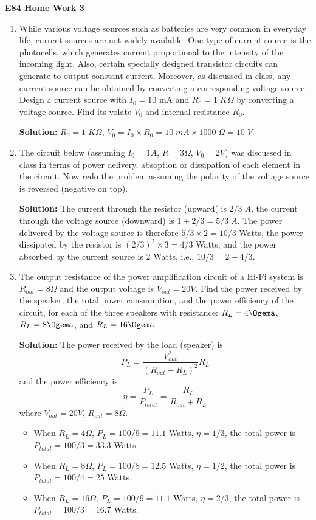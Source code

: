 \usepackage{html}

\begin{center}
{\Large \bf E84 Home Work 3}
\end{center}
\begin{enumerate}

\item While various voltage sources such as batteries are very common 
in everyday life, current sources are not widely available. One type of
current source is the photocells, which generates current proportional 
to the intensity of the incoming light. Also, certain specially designed
transistor circuits can generate to output constant current. Moreover, 
as discussed in class, any current source can be obtained by converting
a corresponding voltage source. Design a current source with $I_0=10$ mA 
and $R_0=1\;K\Omega$ by converting a voltage source. Find its volate $V_0$
and internal resistance $R_0$. 

{\bf Solution:} $R_0=1\;K\Omega$, $V_0=I_0\times R_0=10\;mA \times 1000\;
\Omega=10\;V$.

\item The circuit below (assuming $I_0=1A$, $R=3\Omega$, $V_0=2V$) was
discussed in class in terms of power delivery, absoption or dissipation 
of each element in the circuit. Now redo the problem assuming the polarity
of the voltage source is reversed (negative on top). 


{\bf Solution:} The current through the resistor (upward( is $2/3\; A$,
the current through the voltage source (downward) is $1+2/3=5/3\;A$. 
The power delivered by the voltage source is therefore $5/3\times 2=10/3$
Watts, the power dissipated by the resistor is $(2/3)^2\times 3=4/3$ 
Watts, and the power absorbed by the current source is 2 Watts, i.e.,
$10/3=2+4/3$.

\item The output resistance of the power amplification circuit of
  a Hi-Fi system is $R_{out}=8\Omega$ and the output voltage is 
  $V_{out}=20V$. Find the power received by the speaker, the total
  power consumption, and the power efficiency of the circuit, for 
  each of the three speakers with resistance: $R_L=4\Ogema$, 
  $R_L=8\Ogema$, and $R_L=16\Ogema$

{\bf Solution:} The power received by the load (speaker) is 
\[ P_L=\frac{V_{out}^2}{(R_{out}+R_L)^2} R_L \]
and the power efficiency is
\[ \eta=\frac{P_L}{P_{total}}=\frac{R_L}{R_{out}+R_L} \]
where $V_{out}=20V$, $R_{out}=8\Omega$. 
\begin{itemize}
\item When $R_L=4\Omega$, $P_L=100/9=11.1$ Watts, $\eta=1/3$, 
  the total power is $P_{total}=100/3=33.3$ Watts.
\item When $R_L=8\Omega$, $P_L=100/8=12.5$ Watts, $\eta=1/2$,
  the total power is $P_{total}=100/4=25$ Watts.
\item When $R_L=16\Omega$, $P_L=100/9=11.1$ Watts, $\eta=2/3$,
  the total power is $P_{total}=100/3=16.7$ Watts.
\end{itemize}


\end{enumerate}
